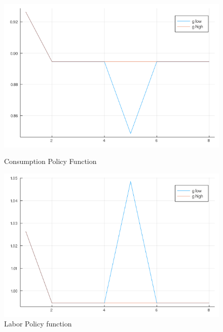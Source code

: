 \documentclass[12pt]{article}
\begin{document}
\begin{figure}[h]
    \centering
    \begin{minipage}{0.45\textwidth}
        \centering
        \includegraphics[width=1\textwidth]{QE_C.png} %
        \caption{Consumption Policy Function}
    \end{minipage}\hfill
    \begin{minipage}{0.45\textwidth}
        \centering
        \includegraphics[width=1\textwidth]{QE_N.png} %
        \caption{Labor Policy function}
    \end{minipage}
\end{figure}
\end{document}
